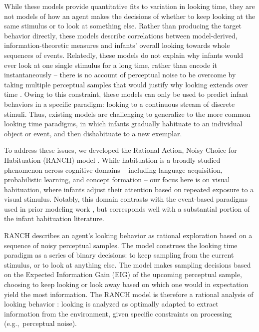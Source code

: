 \documentclass[
]{article}
\begin{document}
While these models provide quantitative fits to variation in looking time, they are not models of how an agent makes the decisions of whether to keep looking at the same stimulus or to look at something else. Rather than producing the target behavior directly, these models describe correlations between model-derived, information-theoretic measures and infants' overall looking towards whole sequences of events. Relatedly, these models do not explain why infants would ever look at one single stimulus for a long time, rather than encode it instantaneously -- there is no account of perceptual noise to be overcome by taking multiple perceptual samples that would justify why looking extends over time \autocites[c.f.][]{callaway2021fixation,kersten2004object}. Owing to this constraint, these models can only be used to predict infant behaviors in a specific paradigm: looking to a continuous stream of discrete stimuli.  Thus, existing models are challenging to generalize to the more common looking time paradigms, in which infants gradually habituate to an individual object or event, and then dishabituate to a new exemplar.

To address these issues, we developed the Rational Action, Noisy Choice for Habituation (RANCH) model \autocite{cao2023habituation}. While habituation is a broadly studied phenomenon across cognitive domains -- including language acquisition, probabilistic learning, and concept formation -- our focus here is on visual habituation, where infants adjust their attention based on repeated exposure to a visual stimulus. Notably, this domain contrasts with the event-based paradigms used in prior modeling work \autocite{kidd2012goldilocks,poli2020infants,poli2023eight}, but corresponds well with a substantial portion of the infant habituation literature.

RANCH describes an agent's looking behavior as rational exploration based on a sequence of noisy perceptual samples. The model construes the looking time paradigm as a series of binary decisions: to keep sampling from the current stimulus, or to look at anything else. The model makes sampling decisions based on the Expected Information Gain (EIG) of the upcoming perceptual sample, choosing to keep looking or look away based on which one would in expectation yield the most information. The RANCH model is therefore a rational analysis of looking behavior \autocite{lieder2020resource,oaksford1994rational,anderson1991human}: looking is analyzed as optimally adapted to extract information from the environment, given specific constraints on processing (e.g.,~perceptual noise).
\end{document}

